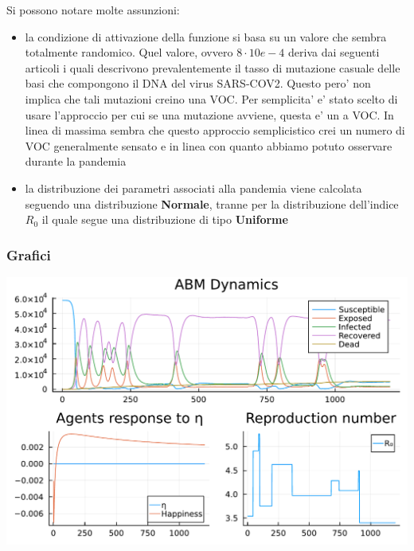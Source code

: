 Si possono notare molte assunzioni:
\begin{itemize}
	\item la condizione di attivazione della funzione si basa su un valore
	che sembra totalmente randomico. Quel valore, ovvero $8 \cdot 10e-4$ deriva dai
	seguenti articoli \cite{Markov2023} \cite{https://doi.org/10.1002/jmv.27331} \cite{Abavisani2022}
	i quali descrivono prevalentemente il tasso di mutazione casuale delle basi che compongono
	il DNA del virus SARS-COV2. Questo pero' non implica che tali mutazioni 
	creino una VOC. Per semplicita' e' stato scelto di usare l'approccio per cui
	se una mutazione avviene, questa e' un a VOC. In linea di massima sembra che 
	questo approccio semplicistico crei un numero di VOC generalmente sensato e 
	in linea con quanto abbiamo potuto osservare durante la pandemia
	\item la distribuzione dei parametri associati alla pandemia viene calcolata
	seguendo una distribuzione \textbf{Normale}, tranne per la distribuzione dell'indice $R_0$
	il quale segue una distribuzione di tipo \textbf{Uniforme} \cite{wiki:Numero_di_riproduzione_di_base}
\end{itemize}

\subsubsection*{Grafici}

\begin{minipage}{\linewidth}
	\centering
	\includegraphics[width=\textwidth]{img/ABM SEIR NO INTERVENTION_2023-06-17.pdf}
	\label{fig:abm_no_intervent}
\end{minipage}